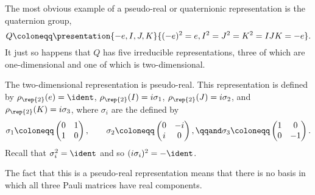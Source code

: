 \begin{exm}{}{}
    The most obvious example of a pseudo-real or quaternionic representation
    is the quaternion group,
    \begin{equation}
        Q \coloneqq \presentation{-e, I, J, K}{(-e)^2 = e, I^2 = J^2 = K^2 =
            IJK = -e}.
    \end{equation}
    It just so happens that \(Q\) has five irreducible representations,
    three of which are one-dimensional and one of which is two-dimensional.
    
    The two-dimensional representation is pseudo-real.
    This representation is defined by \(\rho_{\rep{2}}(e) = \ident\),
    \(\rho_{\rep{2}}(I) = i\sigma_1\), \(\rho_{\rep{2}}(J) = i\sigma_2\), and
    \(\rho_{\rep{2}}(K) = i\sigma_3\), where \(\sigma_i\) are the  defined by
    \begin{equation}
        \sigma_1 \coloneqq 
        \begin{pmatrix}
            0 & 1\\
            1 & 0
        \end{pmatrix}
        , \qquad\sigma_2 \coloneqq 
        \begin{pmatrix}
            0 & -i\\
            i & 0
        \end{pmatrix}
        , \qqand \sigma_3 \coloneqq
        \begin{pmatrix}
            1 & 0\\
            0 & -1
        \end{pmatrix}
        .
    \end{equation}
    Recall that \(\sigma_i^2 = \ident\) and so \((i\sigma_i)^2 = -\ident\).
    
    The fact that this is a pseudo-real representation means that there is
    no basis in which all three Pauli matrices have real components.
    

\end{exm}
